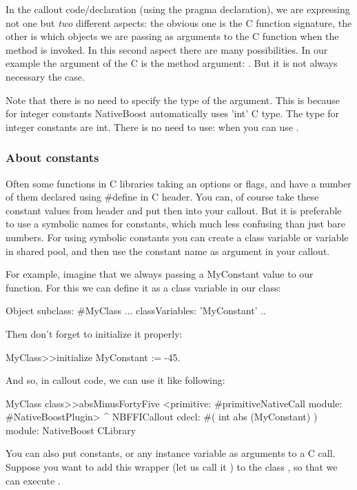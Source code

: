 \documentclass[a4paper,10pt,twoside]{book}
\begin{document}
In the   callout code/declaration (using the pragma declaration), we are expressing not one but \emph{two} different aspects: the obvious one is the C function signature, the other
is which objects we are passing as arguments to the C function when the method is invoked. In this second aspect there are many possibilities. In our example the argument of the C is  the method argument: . But it is not always necessary the case.

Note that there is no need to specify the type of the argument. This is
because for integer constants NativeBoost automatically uses 'int' C type.
The type for integer constants are int. There is no need to use: 
when you can use . 


\subsubsection{About constants}
Often some functions in C libraries taking an options or flags, and
have a number of them declared using \#define in C header.
You can, of course take these constant values from header and put then
into your callout. But it is preferable to use a symbolic names for
constants, which much less confusing than just bare numbers.
For using symbolic constants you can create a class variable or
variable in shared pool, and then use the constant name as argument in
your callout.


For example, imagine that we always passing a MyConstant value to our
function. For this we can define it as a class variable in our class:

\begin{code}{}
Object subclass: #MyClass
	...
	classVariables: 'MyConstant'
..
\end{code}
Then don't forget to initialize it properly:

\begin{code}{}
MyClass>>initialize
	MyConstant := -45.
\end{code}

And so, in callout code, we can use it like following:

\begin{code}{}
MyClass class>>absMinusFortyFive
	<primitive: #primitiveNativeCall module: #NativeBoostPlugin>
	^ NBFFICallout cdecl: #( int abs (MyConstant) ) module: NativeBoost CLibrary
\end{code}




You can also put constants,  or any instance variable as arguments to a C call. Suppose you want to add this  wrapper (let us call it ) to the class , so that we can execute .
\end{document}
